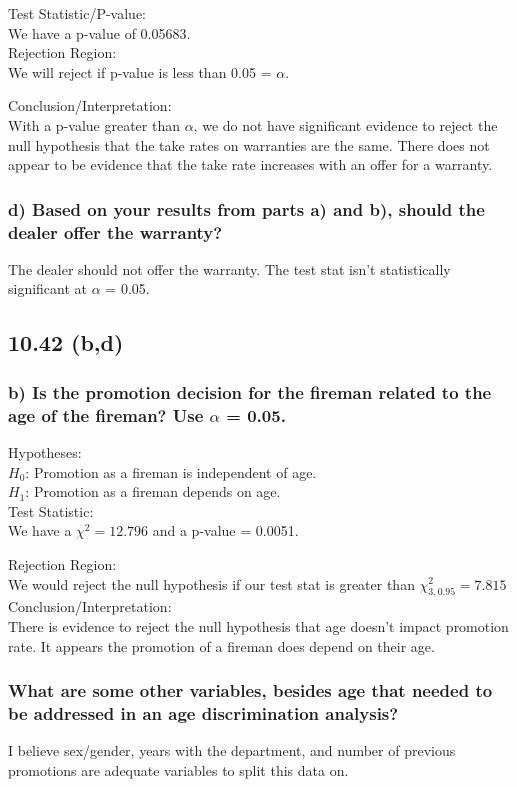 \documentclass{article}
\begin{document}
Test Statistic/P-value: \\
We have a p-value of 0.05683. \\

Rejection Region: \\
We will reject if p-value is less than 0.05 = $\alpha$.  

Conclusion/Interpretation: \\
With a p-value greater than $\alpha$, we do not have significant evidence to reject the null hypothesis that the take rates on warranties are the same.  There does not appear to be evidence that the take rate increases with an offer for a warranty.  

\subsubsection*{d) Based on your results from parts a) and b), should the dealer offer the warranty?}
The dealer should not offer the warranty.  The test stat isn't statistically significant at $\alpha$ = 0.05. 

\subsection*{10.42 (b,d)}
\subsubsection*{b) Is the promotion decision for the fireman related to the age of the fireman? Use $\alpha$ = 0.05.}
Hypotheses: \\
$H_{0}$: Promotion as a fireman is independent of age.  \\ 
$H_{1}$: Promotion as a fireman depends on age.  \\

Test Statistic:\\
We have a $\chi^{2} = 12.796$ and a p-value = 0.0051.

Rejection Region: \\
We would reject the null hypothesis if our test stat is greater than $\chi_{3, 0.95}^{2} = 7.815$ \\

Conclusion/Interpretation: \\
There is evidence to reject the null hypothesis that age doesn't impact promotion rate.  It appears the promotion of a fireman does depend on their age.  

\subsubsection*{What are some other variables, besides age that needed to be addressed in an age discrimination analysis?}
I believe sex/gender, years with the department, and number of previous promotions are adequate variables to split this data on.
\end{document}
